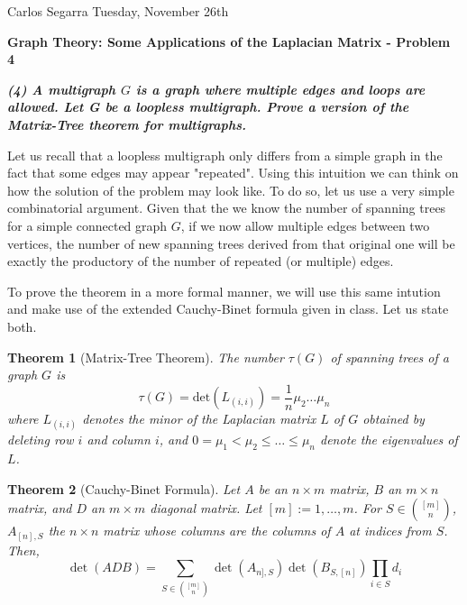 \documentclass[a4paper, 10pt]{article}
\newtheorem{theorem}{Theorem}
\theoremstyle{definition} %
\begin{document}
\onehalfspacing

Carlos Segarra \hfill Tuesday, November 26th

\vspace{15pt}

\textbf{\Large Graph Theory: Some Applications of the Laplacian Matrix - Problem 4}

\vspace{20pt}

\textbf{\textit{(4) A multigraph $G$ is a graph where multiple edges and loops are allowed. Let G be a loopless multigraph. Prove a version of the Matrix-Tree theorem for multigraphs.}}

\vspace{3pt}

Let us recall that a loopless multigraph only differs from a simple graph in the fact that some edges may appear "repeated".
Using this intuition we can think on how the solution of the problem may look like.
To do so, let us use a very simple combinatorial argument.
Given that the we know the number of spanning trees for a simple connected graph $G$, if we now allow multiple edges between two vertices, the number of new spanning trees derived from that original one will be exactly the productory of the number of repeated (or multiple) edges.

To prove the theorem in a more formal manner, we will use this same intution and make use of the extended Cauchy-Binet formula given in class.
Let us state both.

\begin{theorem}[Matrix-Tree Theorem]
    The number $\tau(G)$ of spanning trees of a graph $G$ is
    $$\tau(G) = \text{det}\left(L_{(i,i)}\right) = \frac{1}{n} \mu_2 \dots \mu_n$$
    where $L_{(i,i)}$ denotes the minor of the Laplacian matrix $L$ of $G$ obtained by deleting row $i$ and column $i$, and $0 = \mu_1 < \mu_2 \leq \dots \leq \mu_n$ denote the eigenvalues of $L$.
\end{theorem}

\begin{theorem}[Cauchy-Binet Formula]
    Let $A$ be an $n \times m$ matrix, $B$ an $m \times n$ matrix, and $D$ an $m \times m$ diagonal matrix. Let $[m] := {1, \dots, m}$. For $S \in {[m] \choose n}$, $A_{[n],S}$ the $n \times n$ matrix whose columns are the columns of $A$ at indices from $S$. Then,
    $$\det(ADB) = \sum_{S \in {[m] \choose n}} \det\left(A_{n], S}\right) \det\left(B_{S,[n]}\right) \prod_{i \in S} d_i$$
\end{theorem}
\end{document}
